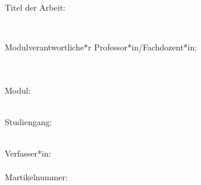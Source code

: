 \begin{titlepage}
    \Huge\textbf{\myThesisType}
    \vspace{1cm}
    
    \normalsize Titel der Arbeit:

    \Large\textbf{\myTitle} \\
    \normalsize
    \mySubtitle

    \vfill

    Modulverantwortliche*r Professor*in/Fachdozent*in: \\
    \myProfessor \\
    \myUniversity \\
    \vspace{1cm}

    Modul: \\
    \myModule \\
    \vspace{1cm}

    Studiengang: \\
    \myCourse \\
    \vspace{1cm}

    Verfasser*in: \\
    \myAuthor \\
    Martikelnummer: \myId

\end{titlepage}